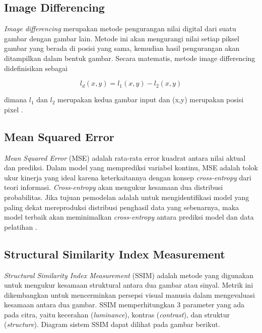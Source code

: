 \subsection{Image Differencing}
\label{imagediff}

\emph{Image differencing} merupakan metode pengurangan nilai digital dari suatu gambar dengan gambar lain. 
Metode ini akan mengurangi nilai setiap piksel gambar yang berada di posisi yang sama, kemudian hasil pengurangan akan ditampilkan dalam bentuk gambar. 
Secara matematis, metode image differencing didefinisikan sebagai

\begin{equation}
  \label{eq:imagediff}
  l_{d}(x,y) =  l_{1}(x,y) - l_{2}(x,y) 
\end{equation}

dimana $l_{1}$ dan $l_{2}$ merupakan kedua gambar input dan (x,y) merupakan posisi pixel \parencite{imgdiff}.

\subsection{Mean Squared Error}
\label{subsec:MSE}

\emph{Mean Squared Error} (MSE) adalah rata-rata error kuadrat antara nilai aktual dan prediksi. 
Dalam model yang memprediksi variabel kontinu, MSE adalah tolok ukur kinerja yang ideal karena keterkaitannya dengan konsep \emph{cross-entropy} dari teori informasi. 
\emph{Cross-entropy} akan mengukur kesamaan dua distribusi probabilitas. 
Jika tujuan pemodelan adalah untuk mengidentifikasi model yang paling dekat mereproduksi distribusi penghasil data yang sebenarnya, maka model terbaik akan meminimalkan \emph{cross-entropy} antara prediksi model dan data pelatihan \parencite{MSE}. 

\subsection{Structural Similarity Index Measurement}
\label{subsec:SSIM}

\emph{Structural Similarity Index Measurement} (SSIM) adalah metode yang digunakan untuk mengukur kesamaan struktural antara dua gambar atau sinyal. 
Metrik ini dikembangkan untuk mencerminkan persepsi visual manusia dalam mengevaluasi kesamaan antara dua gambar. 
SSIM memperhitungkan 3 parameter yang ada pada citra, yaitu kecerahan (\emph{luminance}), kontras (\emph{contrast}), dan struktur (\emph{structure}). 
Diagram sistem SSIM dapat dilihat pada gambar berikut.

